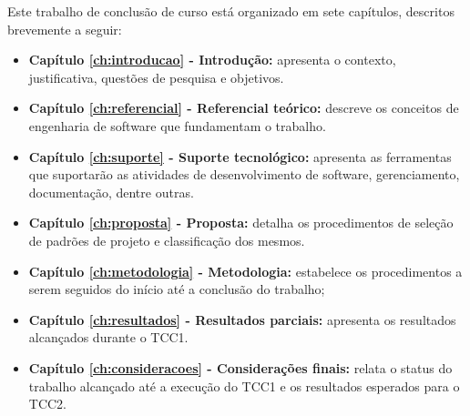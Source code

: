 Este trabalho de conclusão de curso está organizado em sete capítulos, descritos brevemente a seguir:

\begin{itemize}
    \item \textbf{Capítulo \ref{ch:introducao} - Introdução:} apresenta o contexto, justificativa, questões de pesquisa e objetivos.
    \item \textbf{Capítulo \ref{ch:referencial} - Referencial teórico:} descreve os conceitos de engenharia de software que fundamentam o trabalho.
    \item \textbf{Capítulo \ref{ch:suporte} - Suporte tecnológico:} apresenta as ferramentas que suportarão as atividades de desenvolvimento de software, gerenciamento, documentação, dentre outras.
    \item \textbf{Capítulo \ref{ch:proposta} - Proposta:} detalha os procedimentos de seleção de padrões de projeto e classificação dos mesmos.
    \item \textbf{Capítulo \ref{ch:metodologia} - Metodologia:} estabelece os procedimentos a serem seguidos do início até a conclusão do trabalho;
    \item \textbf{Capítulo \ref{ch:resultados} - Resultados parciais:} apresenta os resultados alcançados durante o TCC1.
    \item \textbf{Capítulo \ref{ch:consideracoes} - Considerações finais:} relata o status do trabalho alcançado até a execução do TCC1 e os resultados esperados para o TCC2.
\end{itemize}






